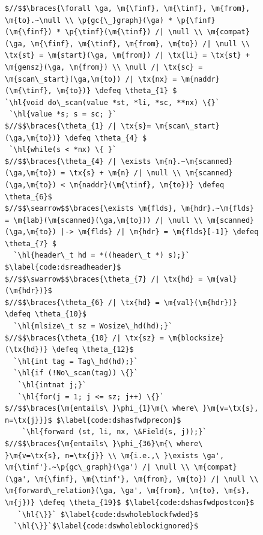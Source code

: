 \documentclass[acmsmall,screen]{acmart}
\makeatletter
\newcommand{\finf}{finf}
\newcommand{\tinf}{tinf}
\newcommand{\braces}[1]{\left\{\!\!\!\begin{array}{l@{}} #1 \end{array}\right\}}
\newcommand{\ga}{\gamma}
\newcommand{\defeq}{\mathbin{\stackrel{\triangle}{=}}}
\newcommand{\tx}[1]{\text{#1}}
\newcommand{\p}[1]{\ensuremath{\mathsf{#1}}} \newcommand{\m}[1]{\ensuremath{\mathit{#1}}} \newcommand{\ma}[1]{\ensuremath{\mathcal{#1}}} \let\ramify\lightning
\newcommand{\hl}[1]{\colorbox{lightgray}{#1}}
\makeatother
\begin{document}
\renewcommand{\tx}[1]{\scriptsize {\text{#1}}}

\begin{figure}[t]
\vspace{-1ex}
  \begin{lstlisting}[multicols = 2]
$//$$\braces{\forall \ga, \m{\finf}, \m{\tinf}, \m{from}, \m{to}.~\null \\ \p{gc{\_}graph}(\ga) * \p{\finf}(\m{\finf}) * \p{\tinf}(\m{\tinf}) /| \null \\ \m{compat}(\ga, \m{\finf}, \m{\tinf}, \m{from}, \m{to}) /| \null \\ \tx{st} = \m{start}(\ga, \m{from}) /| \tx{li} = \tx{st} + \m{gensz}(\ga, \m{from}) \\ \null /| \tx{sc} = \m{scan\_start}(\ga,\m{to}) /| \tx{nx} = \m{naddr}(\m{\tinf}, \m{to})} \defeq \theta_{1} $
`\hl{void do\_scan(value *st, *li, *sc, **nx) \{}`
 `\hl{value *s; s = sc; }`
$//$$\braces{\theta_{1} /| \tx{s}= \m{scan\_start}(\ga,\m{to})} \defeq \theta_{4} $
 `\hl{while(s < *nx) \{ }`
$//$$\braces{\theta_{4} /| \exists \m{n}.~\m{scanned}(\ga,\m{to}) = \tx{s} + \m{n} /| \null \\ \m{scanned}(\ga,\m{to}) < \m{naddr}(\m{\tinf}, \m{to})} \defeq \theta_{6}$
$//$$\searrow$$\braces{\exists \m{flds}, \m{hdr}.~\m{flds} = \m{lab}(\m{scanned}(\ga,\m{to})) /| \null \\ \m{scanned}(\ga,\m{to}) |-> \m{flds} /| \m{hdr} = \m{flds}[-1]} \defeq \theta_{7} $
  `\hl{header\_t hd = *((header\_t *) s);}` $\label{code:dsreadheader}$
$//$$\swarrow$$\braces{\theta_{7} /| \tx{hd} = \m{val}(\m{hdr})}$
$//$$\braces{\theta_{6} /| \tx{hd} = \m{val}(\m{hdr})} \defeq \theta_{10}$
  `\hl{mlsize\_t sz = Wosize\_hd(hd);}`
$//$$\braces{\theta_{10} /| \tx{sz} = \m{blocksize}(\tx{hd})} \defeq \theta_{12}$
  `\hl{int tag = Tag\_hd(hd);}`
  `\hl{if (!No\_scan(tag)) \{}`
   `\hl{intnat j;}`
   `\hl{for(j = 1; j <= sz; j++) \{}`
$//$$\braces{\m{entails\ }\phi_{1}\m{\ where\ }\m{v=\tx{s}, n=\tx{j}}}$ $\label{code:dshasfwdprecon}$
    `\hl{forward (st, li, nx, \&Field(s, j));}` 
$//$$\braces{\m{entails\ }\phi_{36}\m{\ where\ }\m{v=\tx{s}, n=\tx{j}} \\ \m{i.e.,\ }\exists \ga', \m{\tinf'}.~\p{gc\_graph}(\ga') /| \null \\ \m{compat}(\ga', \m{\finf}, \m{\tinf'}, \m{from}, \m{to}) /| \null \\ \m{forward\_relation}(\ga, \ga', \m{from}, \m{to}, \m{s}, \m{j})} \defeq \theta_{19}$ $\label{code:dshasfwdpostcon}$
   `\hl{\}}` $\label{code:dswholeblockfwded}$
  `\hl{\}}`$\label{code:dswholeblockignored}$

\end{lstlisting}
\end{figure}
\end{document}
